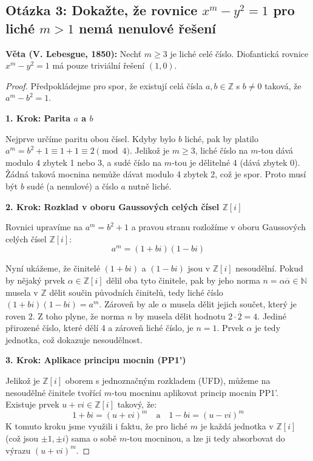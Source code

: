 \documentclass[a4paper,12pt]{article}
\begin{document}
\subsection*{Otázka 3: Dokažte, že rovnice $x^m - y^2 = 1$ pro liché $m > 1$ nemá nenulové řešení}

\textbf{Věta (V. Lebesgue, 1850):} Nechť $m \ge 3$ je liché celé číslo. Diofantická rovnice $x^m - y^2 = 1$ má pouze triviální řešení $(1,0)$.

\begin{proof}
Předpokládejme pro spor, že existují celá čísla $a, b \in \mathbb{Z}$ s $b \neq 0$ taková, že $a^m - b^2 = 1$.

\textbf{1. Krok: Parita $a$ a $b$}
\vspace{0.5em}

Nejprve určíme paritu obou čísel. Kdyby bylo $b$ liché, pak by platilo $a^m = b^2 + 1 \equiv 1 + 1 \equiv 2 \pmod 4$. Jelikož je $m \ge 3$, liché číslo na $m$-tou dává modulo 4 zbytek 1 nebo 3, a sudé číslo na $m$-tou je dělitelné 4 (dává zbytek 0). Žádná taková mocnina nemůže dávat modulo 4 zbytek 2, což je spor. Proto musí být $b$ sudé (a nenulové) a číslo $a$ nutně liché.

\vspace{1em}
\textbf{2. Krok: Rozklad v oboru Gaussových celých čísel $\mathbb{Z}[i]$}
\vspace{0.5em}

Rovnici upravíme na $a^m = b^2 + 1$ a pravou stranu rozložíme v oboru Gaussových celých čísel $\mathbb{Z}[i]$:
$$a^m = (1 + bi)(1 - bi) \text{}$$

Nyní ukážeme, že činitelé $(1+bi)$ a $(1-bi)$ jsou v $\mathbb{Z}[i]$ nesoudělní. Pokud by nějaký prvek $\alpha \in \mathbb{Z}[i]$ dělil oba tyto činitele, pak by jeho norma $n = \alpha \overline{\alpha} \in \mathbb{N}$ musela v $\mathbb{Z}$ dělit součin původních činitelů, tedy liché číslo $(1+bi)(1-bi) = a^m$. Zároveň by ale $\alpha$ musela dělit jejich součet, který je roven $2$. Z toho plyne, že norma $n$ by musela dělit hodnotu $2 \cdot \overline{2} = 4$. Jediné přirozené číslo, které dělí 4 a zároveň liché číslo, je $n = 1$. Prvek $\alpha$ je tedy jednotka, což dokazuje nesoudělnost.

\vspace{1em}
\textbf{3. Krok: Aplikace principu mocnin (PP1')}
\vspace{0.5em}

Jelikož je $\mathbb{Z}[i]$ oborem s jednoznačným rozkladem (UFD), můžeme na nesoudělné činitele tvořící $m$-tou mocninu aplikovat princip mocnin PP1'. Existuje prvek $u + vi \in \mathbb{Z}[i]$ takový, že:
$$1 + bi = (u + vi)^m \quad \text{a} \quad 1 - bi = (u - vi)^m \text{}$$
K tomuto kroku jsme využili i faktu, že pro liché $m$ je každá jednotka v $\mathbb{Z}[i]$ (což jsou $\pm 1, \pm i$) sama o sobě $m$-tou mocninou, a lze ji tedy absorbovat do výrazu $(u+vi)^m$.


\end{proof}
\end{document}
